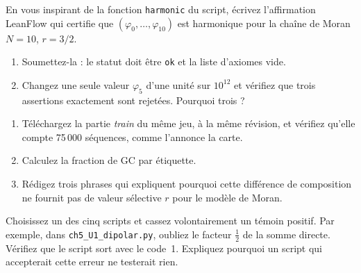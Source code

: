 \begin{exercise}[U5, LeanFlow, (S)]\label{ch5:ex:U5b}
En vous inspirant de la fonction \texttt{harmonic} du script, écrivez l'affirmation LeanFlow qui certifie que
$(\varphi_0,\dots,\varphi_{10})$ est harmonique pour la chaîne de Moran $N=10$, $r=3/2$.
\begin{enumerate}
\item Soumettez-la : le statut doit être \texttt{ok} et la liste d'axiomes vide.
\item Changez une seule valeur $\varphi_5$ d'une unité sur $10^{12}$ et vérifiez que trois assertions exactement sont
rejetées. Pourquoi trois ?
\end{enumerate}
\end{exercise}

\begin{exercise}[U5, données, (S)]\label{ch5:ex:U5c}
\begin{enumerate}
\item Téléchargez la partie \emph{train} du même jeu, à la même révision, et vérifiez qu'elle compte 75\,000 séquences,
comme l'annonce la carte.
\item Calculez la fraction de GC par étiquette.
\item Rédigez trois phrases qui expliquent pourquoi cette différence de composition ne fournit pas de valeur sélective
$r$ pour le modèle de Moran.
\end{enumerate}
\end{exercise}

\begin{exercise}[Témoins, (S)]\label{ch5:ex:temoins}
Choisissez un des cinq scripts et cassez volontairement un témoin positif. Par exemple, dans
\texttt{ch5\_U1\_dipolar.py}, oubliez le facteur $\tfrac12$ de la somme directe. Vérifiez que le script sort avec le
code~1. Expliquez pourquoi un script qui accepterait cette erreur ne testerait rien.
\end{exercise}

\label{ch5:fin}
